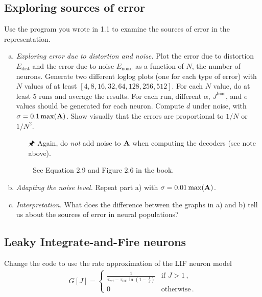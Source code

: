 	\subsection{Exploring sources of error}

	Use the program you wrote in 1.1 to examine the sources of error in the representation.

	\begin{enumerate}[a)]
		\item {} \textit{Exploring error due to distortion and noise.} Plot the error due to distortion $E_\mathrm{dist}$ and the error due to noise $E_\mathrm{noise}$ as a function of $N$, the number of neurons. Generate two different loglog plots (one for each type of error) with $N$ values of at least $[4, 8, 16, 32, 64, 128, 256, 512]$. For each $N$ value, do at least $5$ runs and average the results. For each run, different $\alpha$, $J^\mathrm{bias}$, and $e$ values should be generated for each neuron. Compute $d$ under noise, with $\sigma = 0.1 \max({\mathbf{A}})$. Show visually that the errors are proportional to $1/N$ or $1/N^2$.
		\begin{itemize}
			\item[{\symbolfont 🖈}] Again, do \textit{not} add noise to ${\mathbf{A}}$ when computing the decoders (see note above).
			\item[{\symbolfont 📖}] See Equation 2.9 and Figure 2.6 in the book.
		\end{itemize}
		\item {} \textit{Adapting the noise level.} Repeat part a) with $\sigma = 0.01 \max({\mathbf{A}})$.
		\item {} \textit{Interpretation.} What does the difference between the graphs in a) and b) tell us about the sources of error in neural populations?
	\end{enumerate}

	\subsection{Leaky Integrate-and-Fire neurons}

	Change the code to use the rate approximation of the LIF neuron model
	\begin{align*}
		G[J] = \begin{cases} {\frac{1}{\tau_\mathrm{ref}-\tau_\mathrm{RC}\ln(1-\frac{1}J)}} &\mbox{if } J > 1 \,, \\ 0 &\mbox{otherwise} \,.\end{cases}
	\end{align*}

